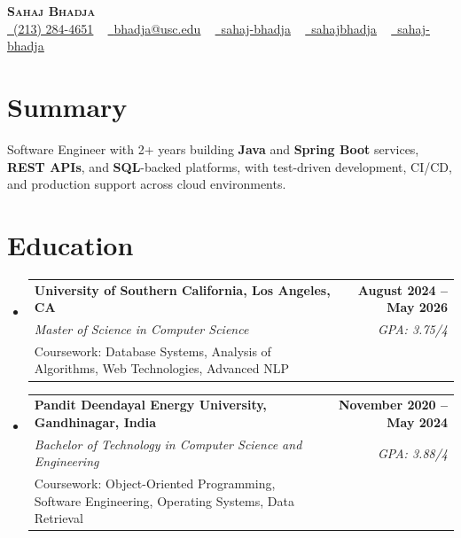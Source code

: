 \documentclass[letterpaper,10pt]{article}
\makeatletter
\newcommand{\sectionGap}{\vspace{-8pt}}
\newcommand{\resumeEduSubheading}[5]{\vspace{-1pt}\item\begin{tabular*}{1.0\textwidth}[t]{l@{\extracolsep{\fill}}r}\textbf{#1} & \textbf{\small #2} \\\textit{\small #3} & \textit{\small #4} \\\small #5 & \\\end{tabular*}\vspace{-4pt}}
\newcommand{\resumeSubHeadingListStart}{\begin{itemize}[leftmargin=0.0in, label={}]}
\newcommand{\resumeSubHeadingListEnd}{\end{itemize}}
\makeatother
\begin{document}
\begin{center}
{\Huge \scshape \textbf{Sahaj Bhadja}} \\ \vspace{1pt}
\small \href{tel:2132844651}{\faPhone\ \underline{(213) 284-4651}} ~ \href{mailto:bhadja@usc.edu}{\raisebox{-0.2\height}\faEnvelope\ \underline{bhadja@usc.edu}} ~
\href{https://www.linkedin.com/in/sahaj-bhadja/}{\raisebox{-0.2\height}\faLinkedin\ \underline{sahaj-bhadja}} ~ \href{https://github.com/SAHAJ-BHADJA}{\raisebox{-0.2\height}\faGithub\ \underline{sahajbhadja}} ~
\href{https://sahaj-bhadja.vercel.app/}{\raisebox{-0.2\height}\faGlobe\ \underline{sahaj-bhadja}}
\end{center}
\vspace{-16pt}
\section{Summary}
\begin{itemize}[leftmargin=0.15in, label={}]
\small{\item{Software Engineer with 2+ years building \textbf{Java} and \textbf{Spring Boot} services, \textbf{REST APIs}, and \textbf{SQL}-backed platforms, with test-driven development, CI/CD, and production support across cloud environments.}}
\end{itemize}
\sectionGap
\section{Education}
\resumeSubHeadingListStart
\resumeEduSubheading{University of Southern California, Los Angeles, CA}{August 2024 -- May 2026}{Master of Science in Computer Science}{GPA: 3.75/4}{Coursework: Database Systems, Analysis of Algorithms, Web Technologies, Advanced NLP}
\resumeEduSubheading{Pandit Deendayal Energy University, Gandhinagar, India}{November 2020 -- May 2024}{Bachelor of Technology in Computer Science and Engineering}{GPA: 3.88/4}{Coursework: Object-Oriented Programming, Software Engineering, Operating Systems, Data Retrieval}
\resumeSubHeadingListEnd
\sectionGap
\end{document}

